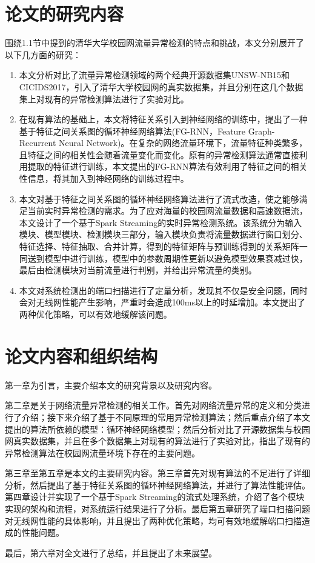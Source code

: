 \section{论文的研究内容}
围绕1.1节中提到的清华大学校园网流量异常检测的特点和挑战，本文分别展开了以下几方面的研究：
\begin{enumerate}
  \item 本文分析对比了流量异常检测领域的两个经典开源数据集UNSW-NB15和CICIDS2017，引入了清华大学校园网的真实数据集，并且分别在这几个数据集上对现有的异常检测算法进行了实验对比。
  \item 在现有算法的基础上，本文将特征关系引入到神经网络的训练中，提出了一种基于特征之间关系图的循环神经网络算法(FG-RNN，Feature Graph-Recurrent Neural Network)。在复杂的网络流量环境下，流量特征种类繁多，且特征之间的相关性会随着流量变化而变化。原有的异常检测算法通常直接利用提取的特征进行训练，本文提出的FG-RNN算法有效利用了特征之间的相关性信息，将其加入到神经网络的训练过程中。
  \item 本文对基于特征之间关系图的循环神经网络算法进行了流式改造，使之能够满足当前实时异常检测的需求。为了应对海量的校园网流量数据和高速数据流，本文设计了一个基于Spark Streaming的实时异常检测系统。该系统分为输入模块、模型模块、检测模块三部分，输入模块负责将流量数据进行窗口划分、特征选择、特征抽取、合并计算，得到的特征矩阵与预训练得到的关系矩阵一同送到模型中进行训练，模型中的参数周期性更新以避免模型效果衰减过快，最后由检测模块对当前流量进行判别，并给出异常流量的类别。
  \item 本文对系统检测出的端口扫描进行了定量分析，发现其不仅是安全问题，同时会对无线网性能产生影响，严重时会造成100ms以上的时延增加。本文提出了两种优化策略，可以有效地缓解该问题。

\end{enumerate}

\section{论文内容和组织结构}
第一章为引言，主要介绍本文的研究背景以及研究内容。

第二章是关于网络流量异常检测的相关工作。首先对网络流量异常的定义和分类进行了介绍；接下来介绍了基于不同原理的常用异常检测算法；然后重点介绍了本文提出的算法所依赖的模型：循环神经网络模型；然后分析对比了开源数据集与校园网真实数据集，并且在多个数据集上对现有的算法进行了实验对比，指出了现有的异常检测算法在校园网流量环境下存在的主要问题。

第三章至第五章是本文的主要研究内容。第三章首先对现有算法的不足进行了详细分析，然后提出了基于特征关系图的循环神经网络算法，并进行了算法性能评估。第四章设计并实现了一个基于Spark Streaming的流式处理系统，介绍了各个模块实现的架构和流程，对系统运行结果进行了分析。最后第五章研究了端口扫描问题对无线网性能的具体影响，并且提出了两种优化策略，均可有效地缓解端口扫描造成的性能问题。

最后，第六章对全文进行了总结，并且提出了未来展望。
